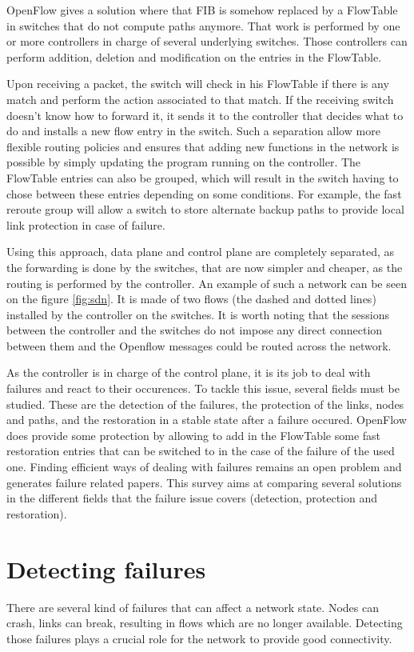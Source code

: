 \documentclass[]{IEEEtran}
\begin{document}
OpenFlow gives a solution where that FIB is somehow replaced by a FlowTable in switches that do not compute paths anymore. That work is performed by one or more controllers in charge of several underlying switches. Those controllers can perform addition, deletion and modification on the entries in the FlowTable.

Upon receiving a packet, the switch will check in his FlowTable if there is any match and perform the action associated to that match. If the receiving switch doesn't know how to forward it, it sends it to the controller that decides what to do and installs a new flow entry in the switch. Such a separation allow more flexible routing policies and ensures that adding new functions in the network is possible by simply updating the program running on the controller. The FlowTable entries can also be grouped, which will result in the switch having to chose between these entries depending on some conditions. For example, the fast reroute group will allow a switch to store alternate backup paths to provide local link protection in case of failure.

Using this approach, data plane and control plane are completely separated, as the forwarding is done by the switches, that are now simpler and cheaper, as the routing is performed by the controller. An example of such a network can be seen on the figure \ref{fig:sdn}. It is made of two flows (the dashed and dotted lines) installed by the controller on the switches. It is worth noting that the sessions between the controller and the switches do not impose any direct connection between them and the Openflow messages could be routed across the network.

As the controller is in charge of the control plane, it is its job to deal with failures and react to their occurences. To tackle this issue, several fields must be studied. These are the detection of the failures, the protection of the links, nodes and paths, and the restoration in a stable state after a failure occured. OpenFlow does provide some protection by allowing to add in the FlowTable some fast restoration entries that can be switched to in the case of the failure of the used one. Finding efficient ways of dealing with failures remains an open problem and generates failure related papers. This survey aims at comparing several solutions in the different fields that the failure issue covers (detection, protection and restoration).

\section{Detecting failures}
There are several kind of failures that can affect a network state. Nodes can crash, links can break, resulting in flows which are no longer available. Detecting those failures plays a crucial role for the network to provide good connectivity.
\end{document}

